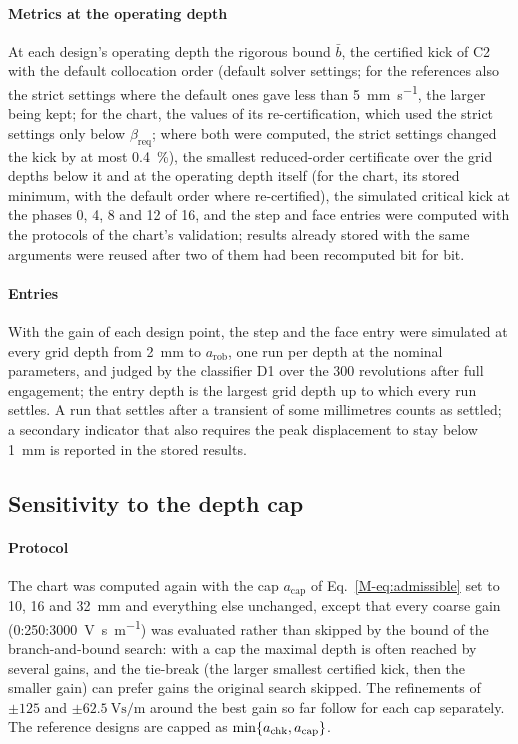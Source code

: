 \paragraph{Metrics at the operating depth} At each design's operating depth the rigorous bound $\bar b$, the certified kick of C2 with the default collocation order (default solver settings; for the references also the strict settings where the default ones gave less than \SI{5}{\milli\metre\per\second}, the larger being kept; for the chart, the values of its re-certification, which used the strict settings only below $\beta_{\mathrm{req}}$; where both were computed, the strict settings changed the kick by at most \SI{0.4}{\percent}), the smallest reduced-order certificate over the grid depths below it and at the operating depth itself (for the chart, its stored minimum, with the default order where re-certified), the simulated critical kick at the phases 0, 4, 8 and 12 of 16, and the step and face entries were computed with the protocols of the chart's validation; results already stored with the same arguments were reused after two of them had been recomputed bit for bit.

\paragraph{Entries} With the gain of each design point, the step and the face entry were simulated at every grid depth from \SI{2}{\milli\metre} to $a_{\mathrm{rob}}$, one run per depth at the nominal parameters, and judged by the classifier D1 over the 300 revolutions after full engagement; the entry depth is the largest grid depth up to which every run settles. A run that settles after a transient of some millimetres counts as settled; a secondary indicator that also requires the peak displacement to stay below \SI{1}{\milli\metre} is reported in the stored results.

\subsection{Sensitivity to the depth cap}\label{supp:ba-cap}

\paragraph{Protocol} The chart was computed again with the cap $a_{\mathrm{cap}}$ of Eq.~\eqref{M-eq:admissible} set to 10, 16 and \SI{32}{\milli\metre} and everything else unchanged, except that every coarse gain (0:250:\SI{3000}{\volt\second\per\metre}) was evaluated rather than skipped by the bound of the branch-and-bound search: with a cap the maximal depth is often reached by several gains, and the tie-break (the larger smallest certified kick, then the smaller gain) can prefer gains the original search skipped. The refinements of $\pm125$ and $\pm\SI{62.5}{\volt\second\per\metre}$ around the best gain so far follow for each cap separately. The reference designs are capped as $\min\{a_{\mathrm{chk}},a_{\mathrm{cap}}\}$.

